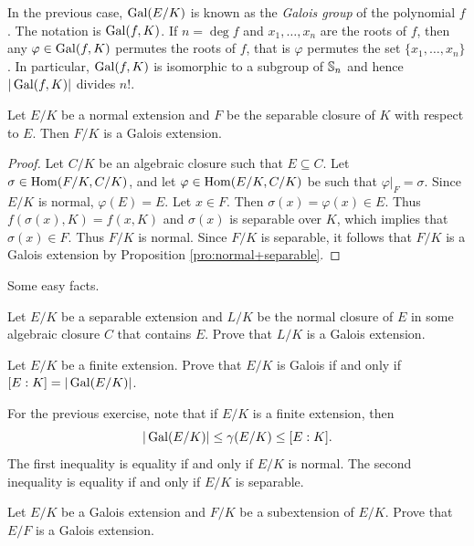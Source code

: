 In the previous case, $\operatorname{Gal}(E/K)$ is known as the \emph{Galois group}
of the polynomial $f$. The notation is $\operatorname{Gal}(f,K)$. If $n=\deg f$ and
$x_1,\dots,x_n$ are the roots of $f$, then any 
$\varphi\in\operatorname{Gal}(f,K)$ permutes the roots of $f$, that is
$\varphi$ permutes the 
set $\{x_1,\dots,x_n\}$. In particular, $\operatorname{Gal}(f,K)$ is isomorphic to a subgroup of
$\mathbb{S}_n$ and hence $|\operatorname{Gal}(f,K)|$ divides $n!$. 

\begin{proposition}
    Let $E/K$ be a normal extension and $F$ be the separable
    closure of $K$ with respect to $E$. 
    Then $F/K$ is a Galois extension.
\end{proposition}

\begin{proof} 
    Let $C/K$ be an algebraic closure such that $E\subseteq C$. Let $\sigma\in\operatorname{Hom}(F/K,C/K)$, and let $\varphi\in\operatorname{Hom}(E/K,C/K)$ be such that $\varphi|_F=\sigma$. Since $E/K$ is normal, 
    $\varphi(E)=E$. Let $x\in F$. Then $\sigma(x)=\varphi(x)\in E$. Thus
    $f(\sigma(x),K)=f(x,K)$ and $\sigma(x)$ is separable over $K$, which 
    implies that $\sigma(x)\in F$. Thus $F/K$ is normal. Since $F/K$ is separable, it follows
    that $F/K$ is a Galois extension by Proposition \ref{pro:normal+separable}.
\end{proof}

Some easy facts.

\begin{exercise}
    Let $E/K$ be a separable extension and $L/K$ be the normal 
    closure of $E$ in some algebraic closure $C$
    that contains $E$. Prove that $L/K$ is a Galois extension.
\end{exercise}

\begin{exercise}
    Let $E/K$ be a finite extension. Prove that $E/K$ is Galois
    if and only if $[E:K]=|\operatorname{Gal}(E/K)|$.
\end{exercise}

For the previous exercise, 
note that if $E/K$ is a finite extension, then  
\[
|\operatorname{Gal}(E/K)|\leq\gamma(E/K)\leq [E:K].
\]
The first inequality
is equality if and only if $E/K$ is normal. The second
inequality is equality if and only if $E/K$ is separable.

\begin{exercise}
    Let $E/K$ be a Galois extension and $F/K$ be a subextension of $E/K$. 
    Prove that $E/F$ is a Galois extension. 
\end{exercise}


